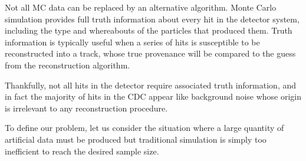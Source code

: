 

Not all MC data can be replaced by an alternative algorithm. Monte Carlo simulation provides full truth information about every hit in the detector system, including the type and whereabouts of the particles that produced them.
Truth information is typically useful when a series of hits is susceptible to be reconstructed into a track, whose true provenance will be compared to the guess from the reconstruction algorithm. %

Thankfully, not all hits in the detector require associated truth information, and in fact the majority of hits in the CDC appear like background noise whose origin is irrelevant to any reconstruction procedure. %

To define our problem, let us consider the situation where a large quantity of artificial data must be produced but traditional simulation is simply too inefficient to reach the desired sample size.


